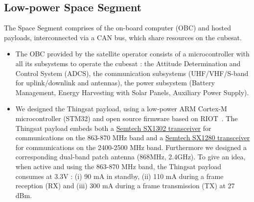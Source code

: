 \subsection*{Low-power Space Segment} 
The Space Segment comprises of the on-board computer (OBC) and hosted payloads, interconnected via a CAN bus, which share resources on the cubesat.
\begin{itemize}
\item The OBC provided by the satellite operator consists of 
a microcontroller with all its subsystems to operate the cubesat :
the Attitude Determination and Control System (ADCS),
the communication subsystems (UHF/VHF/S-band for uplink/downlink and antennas),
the power subsystem (Battery Management, Energy Harvesting with Solar Panels, Auxiliary Power Supply). 

\item We designed the Thingsat payload, using a low-power ARM Cortex-M microcontroller (STM32) and open source firmware based on RIOT~\cite{baccelli2018riot}. The Thingsat payload embeds both a
\href{https://www.semtech.com/products/wireless-rf/lora-gateways/sx1302}{Semtech SX1302 transceiver} for communications on the 863-870 MHz band and a
\href{https://www.semtech.com/products/wireless-rf/24-ghz-transceivers/sx1280}{Semtech SX1280 transceiver} for communications on the 2400-2500 MHz band. Furthermore we designed a corresponding dual-band patch antenna (868MHz, 2.4GHz).
To give an idea, when active and using the 863-870 MHz band, the
Thingsat payload consumes at 3.3V : 
(i) 90 mA in standby, 
(ii) 110 mA during a frame reception (RX) and 
(iii) 300 mA during a frame transmission (TX) at 27 dBm.
\end{itemize}


